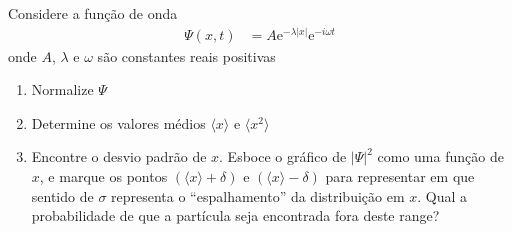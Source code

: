 \begin{prob}
	Considere a função de onda
	\begin{align}
		\Psi(x,t)&=A \mathrm{e}^{-\lambda |x|} \mathrm{e}^{-i\omega t}
	\end{align}
	onde $A$, $\lambda$ e $\omega$ são constantes reais positivas
	\begin{enumerate}[label=\alph *)]
		\item Normalize $\Psi$
		\item Determine os valores médios $\langle x \rangle$ e $\langle x^{2} \rangle$
		\item Encontre o desvio padrão de $x$. Esboce o gráfico de $|\Psi|^2$ como uma função de $x$, e marque os pontos $\left(\langle x \rangle + \delta \right)$ e $\left(\langle x \rangle - \delta\right)$ para representar em que sentido de $\sigma$ representa o ``espalhamento'' da distribuição em $x$. Qual a probabilidade de que a partícula seja encontrada fora deste range?
	\end{enumerate}


\end{prob}
